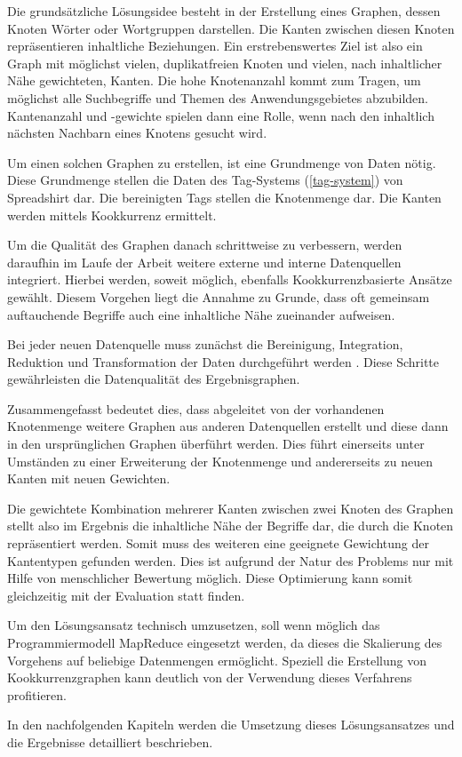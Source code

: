 Die grundsätzliche Lösungsidee besteht in der Erstellung eines Graphen, dessen Knoten Wörter oder Wortgruppen darstellen. Die Kanten zwischen diesen Knoten repräsentieren inhaltliche Beziehungen. Ein erstrebenswertes Ziel ist also ein Graph mit möglichst vielen, duplikatfreien Knoten und vielen, nach inhaltlicher Nähe gewichteten, Kanten. Die hohe Knotenanzahl kommt zum Tragen, um möglichst alle Suchbegriffe und Themen des Anwendungsgebietes abzubilden. Kantenanzahl und -gewichte spielen dann eine Rolle, wenn nach den inhaltlich nächsten Nachbarn eines Knotens gesucht wird.

Um einen solchen Graphen zu erstellen, ist eine Grundmenge von Daten nötig. Diese Grundmenge stellen die Daten des Tag-Systems (\ref{tag-system}) von Spreadshirt dar. Die bereinigten Tags stellen die Knotenmenge dar. Die Kanten werden mittels Kookkurrenz ermittelt.

Um die Qualität des Graphen danach schrittweise zu verbessern, werden daraufhin im Laufe der Arbeit weitere externe und interne Datenquellen integriert. Hierbei werden, soweit möglich, ebenfalls Kookkurrenzbasierte Ansätze gewählt. Diesem Vorgehen liegt die Annahme zu Grunde, dass oft gemeinsam auftauchende Begriffe auch eine inhaltliche Nähe zueinander aufweisen.

Bei jeder neuen Datenquelle muss zunächst die Bereinigung, Integration, Reduktion und Transformation der Daten durchgeführt werden \cite{hkp2012}. Diese Schritte gewährleisten die Datenqualität des Ergebnisgraphen.

Zusammengefasst bedeutet dies, dass abgeleitet von der vorhandenen Knotenmenge weitere Graphen aus anderen Datenquellen erstellt und diese dann in den ursprünglichen Graphen überführt werden. Dies führt einerseits unter Umständen zu einer Erweiterung der Knotenmenge und andererseits zu neuen Kanten mit neuen Gewichten.

Die gewichtete Kombination mehrerer Kanten zwischen zwei Knoten des Graphen stellt also im Ergebnis die inhaltliche Nähe der Begriffe dar, die durch die Knoten repräsentiert werden. Somit muss des weiteren eine geeignete Gewichtung der Kantentypen gefunden werden. Dies ist aufgrund der Natur des Problems nur mit Hilfe von menschlicher Bewertung möglich. Diese Optimierung kann somit gleichzeitig mit der Evaluation statt finden.

Um den Lösungsansatz technisch umzusetzen, soll wenn möglich das Programmiermodell MapReduce \cite{dg2004} eingesetzt werden, da dieses die Skalierung des Vorgehens auf beliebige Datenmengen ermöglicht. Speziell die Erstellung von Kookkurrenzgraphen kann deutlich von der Verwendung dieses Verfahrens profitieren.

In den nachfolgenden Kapiteln werden die Umsetzung dieses Lösungsansatzes und die Ergebnisse detailliert beschrieben.